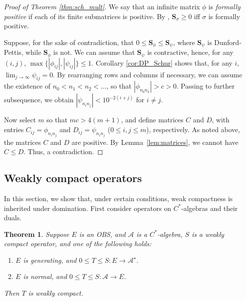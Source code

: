 \documentclass[12pt]{amsart}
\theoremstyle{plain}
\newtheorem{theorem}{Theorem}[subsection]
\theoremstyle{definition}
\renewcommand{\leq}{\leqslant}
\renewcommand{\geq}{\geqslant}\usepackage{amssymb}
\newcommand{\schu}{\mathbf S}
\newcommand{\A}{\mathcal{A}}
\begin{document}
\begin{proof}[Proof of Theorem \ref{thm:sch_mult}]
We say that an infinite matrix $\phi$ is \emph{formally positive}
if each of its finite submatrices is positive. By \cite[Theorem 3.7]{Pa},
$\schu_\sigma \geq 0$ iff $\sigma$ is formally positive.

Suppose, for the sake of contradiction, that
$0 \leq \schu_\phi \leq \schu_\psi$, where $\schu_\psi$ is
Dunford-Pettis, while $\schu_\phi$ is not. We can assume that
$\schu_\psi$ is contractive, hence, for any $(i,j)$,
$\max\{|\phi_{ij}|, |\psi_{ij}|\} \leq 1$.
Corollary \ref{cor:DP_Schur} shows that, for any
$i$, $\lim_{j \to \infty} \psi_{ij} = 0$. By rearranging rows
and columns if necessary, we can assume the existence of
$n_0 < n_1 < n_2 < \ldots$, so that $|\phi_{n_0 n_k}| > c > 0$.
Passing to further subsequence, we obtain
$|\psi_{n_i n_j}| < 10^{-2(i+j)}$ for $i \neq j$.

Now select $m$ so that $mc > 4(m+1)$, and define matrices $C$ and $D$,
with entries $C_{ij} = \phi_{n_i n_j}$ and $D_{ij} = \psi_{n_i n_j}$
($0 \leq i,j \leq m$), respectively. As noted above, the matrices
$C$ and $D$ are positive. By Lemma~\ref{lem:matrices}, we cannot
have $C \leq D$. Thus, a contradiction.
\end{proof}



\subsection{Weakly compact operators}\label{ss:WC}

In this section, we show that, under certain conditions, weak compactness
is inherited under domination.
First consider operators on $C^*$-algebras and their duals.


\begin{theorem}\label{th:weak_comp}
Suppose $E$ is an OBS, and $\A$ is a $C^*$-algebra,
$S$ is a weakly compact operator, and one of the following holds:
\begin{enumerate}
\item
$E$ is generating, and $0 \leq T \leq S : E \to \A^\star$.
\item
$E$ is normal, and $0 \leq T \leq S : \A \to E$.
\end{enumerate}
Then $T$ is weakly compact.
\end{theorem}
\end{document}
